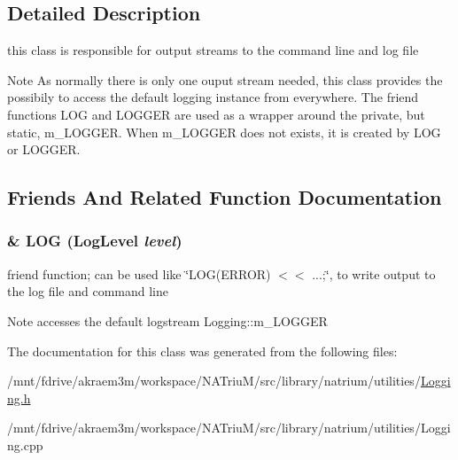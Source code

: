 \subsection{Detailed Description}
this class is responsible for output streams to the command line and log file \begin{DoxyNote}{Note}
As normally there is only one ouput stream needed, this class provides the possibily to access the default logging instance from everywhere. The friend functions LOG and LOGGER are used as a wrapper around the private, but static, m\_\-LOGGER. When m\_\-LOGGER does not exists, it is created by LOG or LOGGER. 
\end{DoxyNote}


\subsection{Friends And Related Function Documentation}
\hypertarget{classnatrium_1_1Logging_a913b816565b3ede4c25b89d25ca5148d}{
\subsubsection[{LOG}]{\& LOG (LogLevel {\em level})}}
\label{classnatrium_1_1Logging_a913b816565b3ede4c25b89d25ca5148d}


friend function; can be used like \char`\"{}LOG(ERROR) $<$$<$ ...;\char`\"{}, to write output to the log file and command line \begin{DoxyNote}{Note}
accesses the default logstream Logging::m\_\-LOGGER 
\end{DoxyNote}


The documentation for this class was generated from the following files:\begin{DoxyCompactItemize}
\item 
/mnt/fdrive/akraem3m/workspace/NATriuM/src/library/natrium/utilities/\hyperlink{Logging_8h}{Logging.h}\item 
/mnt/fdrive/akraem3m/workspace/NATriuM/src/library/natrium/utilities/Logging.cpp\end{DoxyCompactItemize}
